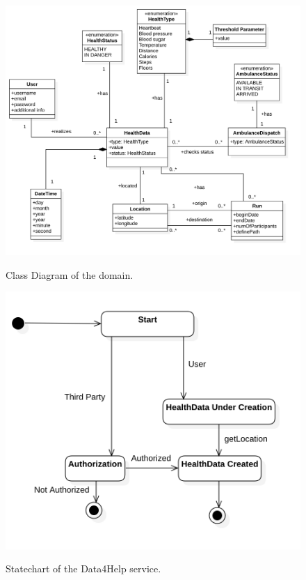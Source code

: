 \documentclass[12pt]{article}
\begin{document}
\begin{figure}[H]
\centering
\includegraphics[scale=0.33]{classDiagram.png}
\label{fig:ClassDiagram}
\caption{Class Diagram of the domain.}
\end{figure}
\newpage

\begin{figure}[H]
\centering
\includegraphics[scale=0.3]{Activity_D4H.png}
\label{fig:Activity_D4H}
\caption{Statechart of the Data4Help service.}
\end{figure}
\end{document}
